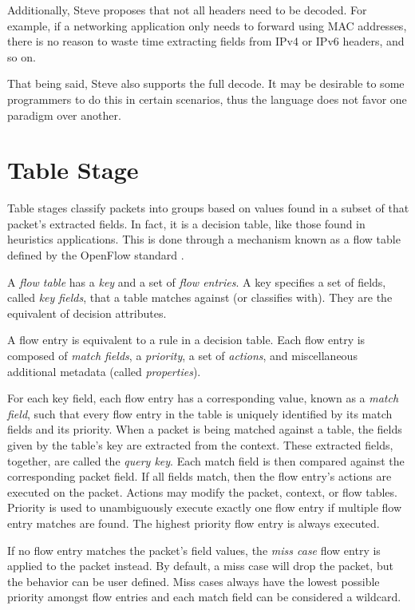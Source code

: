 Additionally, Steve proposes that not all headers need to be decoded. For
example, if a networking application only needs to forward using MAC addresses,
there is no reason to waste time extracting fields from IPv4 or IPv6 headers,
and so on.

That being said, Steve also supports the full decode. It may be desirable to
some programmers to do this in certain scenarios, thus the language does not
favor one paradigm over another.

\section{Table Stage} \label{table_desc}

Table stages classify packets into groups based on values found in a subset of that packet's extracted fields. In fact, it is a decision table, like those found in heuristics applications. This is done
through a mechanism known as a flow table defined by the OpenFlow standard
\cite{openflow_spec}.

A \textit{flow table} has a \textit{key} and a set of \textit{flow entries}.
A key specifies a set of fields, called \textit{key fields}, that a table matches against (or classifies with). They are the equivalent of decision attributes.

A flow entry is equivalent to a rule in a decision table. Each flow entry is composed of \textit{match fields}, a \textit{priority}, a set of
\textit{actions}, and miscellaneous additional metadata (called \textit{properties}). 

For each key field,
each flow entry has a corresponding value, known as a \textit{match field}, such
that every flow entry in the table is uniquely identified by its match fields
and its priority. When a packet is being matched against a table, the fields given by the table's
key are extracted from the context. These extracted fields, together, are called the \textit{query key}. Each match field is then compared against the corresponding packet field. If all fields match, then the flow entry's actions are executed on the packet. Actions may modify the packet, context, or flow tables. Priority is used to unambiguously execute exactly one flow entry if multiple flow entry matches are found. The highest priority flow entry is always executed.

If no flow entry matches the packet's field values, the
\textit{miss case} flow entry is applied to the packet instead. By default, a 
miss case will drop the packet, but the behavior can be user defined. Miss cases always have the lowest possible priority amongst flow
entries and each match field can be considered a wildcard.

